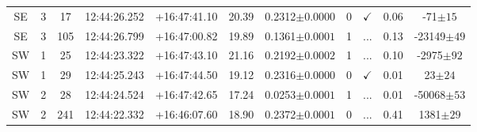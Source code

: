 \begin{table*}
\begin{tabular}{ccccccccccc}
SE & 3 & 17 & 12:44:26.252 & +16:47:41.10 & 20.39 & 0.2312$\pm{0.0000}$ & 0 & $\checkmark$ & 0.06 & -71$\pm{15}$ \\
SE & 3 & 105 & 12:44:26.799 & +16:47:00.82 & 19.89 & 0.1361$\pm{0.0001}$ & 1 & ... & 0.13 & -23149$\pm{49}$ \\
SW & 1 & 25 & 12:44:23.322 & +16:47:43.10 & 21.16 & 0.2192$\pm{0.0002}$ & 1 & ... & 0.10 & -2975$\pm{92}$ \\
SW & 1 & 29 & 12:44:25.243 & +16:47:44.50 & 19.12 & 0.2316$\pm{0.0000}$ & 0 & $\checkmark$ & 0.01 & 23$\pm{24}$ \\
SW & 2 & 28 & 12:44:24.524 & +16:47:42.65 & 17.24 & 0.0253$\pm{0.0001}$ & 1 & ... & 0.01 & -50068$\pm{53}$ \\
SW & 2 & 241 & 12:44:22.332 & +16:46:07.60 & 18.90 & 0.2372$\pm{0.0001}$ & 0 & ... & 0.41 & 1381$\pm{29}$ \\
		\hline
	\end{tabular}
	\label{tbl:XMMXCSJ124425.9+164758.0}
\end{table*}

